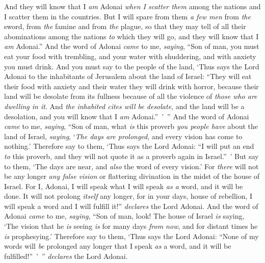 \begin{biblechapter}
\verse And they will know that I \textit{am} Adonai \textit{when I scatter them} among the nations and I scatter them in the countries.
\verse But I will spare from them \textit{a few men} from \textit{the} sword, from \textit{the} famine and from \textit{the} plague, so that they may tell of all their abominations among the nations \textit{to} which they will go, and they will know that I \textit{am} Adonai.”
\verse And the word of Adonai \textit{came} to me, \textit{saying},
\verse “Son of man, you must eat your food with trembling, and your water with shuddering, and with anxiety you must drink.
\verse And you must say to the people of the land, ‘Thus says the Lord Adonai to the inhabitants of Jerusalem about the land of Israel: “They will eat their food with anxiety and their water they will drink with horror, because their land will be desolate from its fullness because of all the violence of \textit{those who are dwelling in it}.
\verse And \textit{the inhabited cites will be desolate}, and the land will be a desolation, and you will know that I \textit{am} Adonai.” ’ ”
\verse And the word of Adonai \textit{came} to me, \textit{saying},
\verse “Son of man, what \textit{is} this proverb \textit{you people have} about the land of Israel, \textit{saying}, ‘\textit{The days are prolonged}, and every vision has come to nothing.’
\verse Therefore say to them, ‘Thus says the Lord Adonai: “I will put an end \textit{to} this proverb, and they will not quote it as a proverb again in Israel.” ’ But say to them, ‘The days are near, and \textit{also} the word of every vision.’
\verse For \textit{there} will not be any longer \textit{any false vision} or flattering divination in the midst of the house of Israel.
\verse For I, Adonai, I will speak what I will speak \textit{as a} word, and it will be done. It will not prolong \textit{itself} any longer, for in your days, house of rebellion, I will speak a word and I will fulfill it!” \textit{declares} the Lord Adonai.
\verse And the word of Adonai \textit{came} to me, \textit{saying},
\verse “Son of man, look! The house of Israel \textit{is} saying, ‘The vision that he \textit{is} seeing \textit{is} for many days \textit{from now}, and for distant times he \textit{is} prophesying.’
\verse Therefore say to them, ‘Thus says the Lord Adonai: “None of my words will \textit{be} prolonged any longer that I speak \textit{as} a word, and it will be fulfilled!” ’ ” \textit{declares} the Lord Adonai.
\end{biblechapter}


